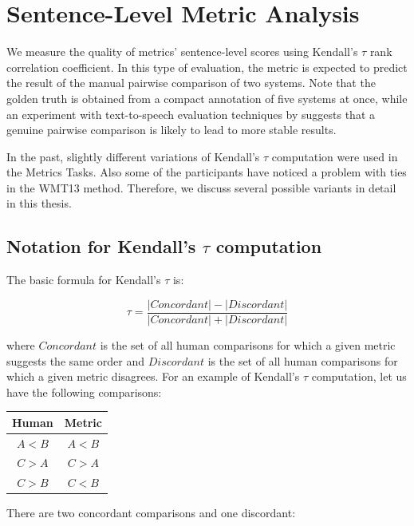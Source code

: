 \section{Sentence-Level Metric Analysis}
\label{segment-level}

We measure the quality of metrics' sentence-level scores using Kendall's $\tau$
rank correlation coefficient. In this type of evaluation, the metric is expected
to predict the result of the manual pairwise comparison of two systems. Note
that the golden truth is obtained from a compact annotation of five systems at
once, while an experiment with text-to-speech evaluation techniques by
 suggests that a genuine pairwise
comparison is likely to lead to more stable results.

In the past, slightly different variations of
Kendall's $\tau$ computation were used in the Metrics Tasks. Also some of the
participants have noticed a problem with ties in the WMT13 method. Therefore, we
discuss several possible variants in detail in this thesis.

\subsection{Notation for Kendall's $\tau{}$ computation}

The basic formula for Kendall's $\tau$ is:

\begin{equation}
    \tau = \frac{|Concordant| - |Discordant|}{|Concordant| + |Discordant|}
\end{equation}

\noindent where $Concordant$ is the set of all human comparisons for which a
given metric suggests the same order and $Discordant$ is the set of all human comparisons for
which a given metric disagrees.
For an example of Kendall's $\tau$ computation, let us have the following comparisons:
\begin{center}
\begin{tabular}{cc}
  Human & Metric \\
  \hline
  $A < B$ & $A < B$ \\
  $C > A$ & $C > A$ \\
  $C > B$ & $C < B$ \\
\end{tabular}
\end{center}

\noindent There are two concordant comparisons and one discordant:

